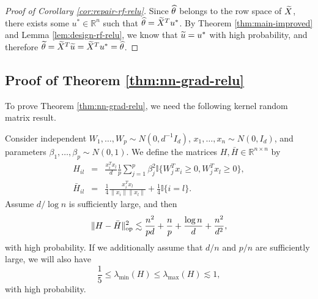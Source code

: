 \begin{proof}[Proof of Corollary \ref{cor:repair-rf-relu}]
Since $\widehat{\theta}$ belongs to the row space of $\widetilde{X}$, there exists some $u^*\in\mathbb{R}^n$ such that $\widehat{\theta}=\widetilde{X}^Tu^*$.
By Theorem \ref{thm:main-improved} and Lemma \ref{lem:design-rf-relu}, we know that $\widetilde{u}=u^*$ with high probability, and therefore $\widetilde{\theta}=\widetilde{X}^T\widetilde{u}=\widetilde{X}^Tu^*=\widehat{\theta}$.
\end{proof}



\subsection{Proof of Theorem \ref{thm:nn-grad-relu}}

To prove Theorem \ref{thm:nn-grad-relu}, we need the following kernel random matrix result.
\begin{lemma}\label{lem:lim-H-relu}
Consider independent $W_1,\ldots,W_p\sim N(0,d^{-1}I_d)$, $x_1,\ldots,x_n\sim N(0,I_d)$, and parameters $\beta_1,\ldots,\beta_p\sim N(0,1)$. We define the matrices $H, \bar{H}\in\mathbb{R}^{n\times n}$ by
\begin{eqnarray*}
H_{il} &=& \frac{x_i^Tx_l}{d}\frac{1}{p}\sum_{j=1}^p\beta_j^2\mathbb{I}\{W_j^Tx_i\geq 0, W_j^Tx_l\geq 0\}, \\
\bar{H}_{il} &=& \frac{1}{4}\frac{x_i^Tx_l}{\|x_i\|\|x_l\|} + \frac{1}{4}\mathbb{I}\{i=l\}.
\end{eqnarray*}
Assume $d/\log n$ is sufficiently large, and then
$$\|H-\bar{H}\|_{\rm op}^2 \lesssim \frac{n^2}{pd} + \frac{n}{p} + \frac{\log n}{d} + \frac{n^2}{d^2},$$
with high probability. If we additionally assume that $d/n$ and $p/n$ are sufficiently large, we will also have
$$\frac{1}{5}\leq\lambda_{\min}(H)\leq\lambda_{\max}(H)\lesssim 1,$$
with high probability.
\end{lemma}
